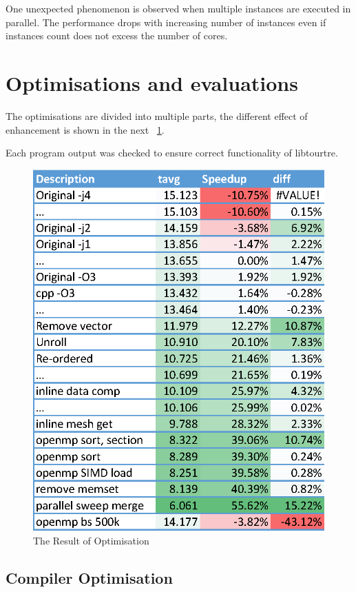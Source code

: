 \documentclass[conference]{IEEEtran}
\newcommand{\fref}[1]{\figurename~\ref{#1}}
\begin{document}
One unexpected phenomenon is observed when multiple instances are executed in parallel. The performance drops with increasing number of instances even if instances count does not excess the number of cores.

\section{Optimisations and evaluations}

The optimisations are divided into multiple parts, the different effect of enhancement is shown in the next \fref{fig:log}. 

Each program output was checked to ensure correct functionality of libtourtre.

\begin{figure}[t]
    \centering
    \includegraphics[width=\columnwidth]{data_log}
    \caption{The Result of Optimisation}
    \label{fig:log}
\end{figure}

\subsection{Compiler Optimisation}
\end{document}
